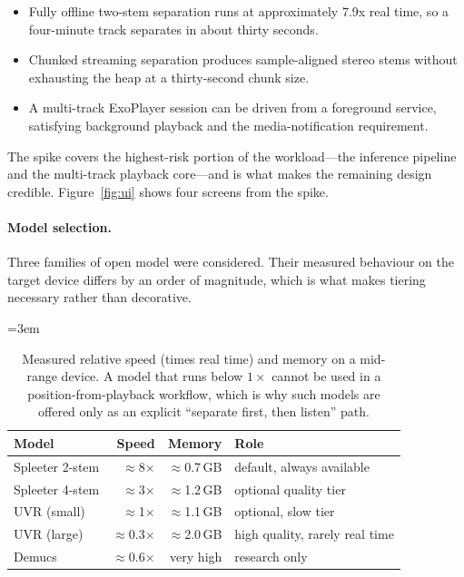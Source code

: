 \documentclass[letterpaper]{article} %
\newcommand{\nohyph}{\hyphenpenalty=10000 \exhyphenpenalty=10000 \tolerance=10000 \emergencystretch=3em}
\begin{document}
\begin{itemize}
\item Fully offline two-stem separation runs at approximately 7.9x real time,
so a four-minute track separates in about thirty seconds.
\item Chunked streaming separation produces sample-aligned stereo stems without
exhausting the heap at a thirty-second chunk size.
\item A multi-track ExoPlayer session can be driven from a foreground service,
satisfying background playback and the media-notification requirement.
\end{itemize}

The spike covers the highest-risk portion of the workload---the inference
pipeline and the multi-track playback core---and is what makes the remaining
design credible. Figure~\ref{fig:ui} shows four screens from the spike.

\paragraph{Model selection.} Three families of open model were considered.
Their measured behaviour on the target device differs by an order of magnitude,
which is what makes tiering necessary rather than decorative.

\begin{table}[t]
\begingroup
\centering
\footnotesize
\nohyph
\setlength{\tabcolsep}{3pt}
\begin{tabular}{@{}l r r l@{}}
\hline
\textbf{Model} & \textbf{Speed} & \textbf{Memory} & \textbf{Role} \\
\hline
Spleeter 2-stem & $\approx$8$\times$ & $\approx$0.7\,GB & default, always available \\
Spleeter 4-stem & $\approx$3$\times$ & $\approx$1.2\,GB & optional quality tier \\
UVR (small)     & $\approx$1$\times$ & $\approx$1.1\,GB & optional, slow tier \\
UVR (large)     & $\approx$0.3$\times$ & $\approx$2.0\,GB & high quality, rarely real time \\
Demucs          & $\approx$0.6$\times$ & very high   & research only \\
\hline
\end{tabular}
\caption{Measured relative speed (times real time) and memory on a mid-range
device. A model that runs below $1\times$ cannot be used in a position-from-playback
workflow, which is why such models are offered only as an explicit
``separate first, then listen'' path.}
\label{tab:models}
\endgroup
\end{table}
\end{document}
